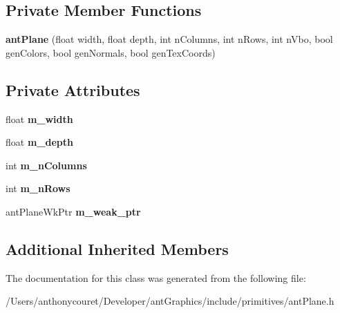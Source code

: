 \subsection*{Private Member Functions}
\begin{DoxyCompactItemize}
\item 
\hypertarget{classant_plane_a247818056d0868caa48ae8fe8be7cea8}{{\bfseries ant\+Plane} (float width, float depth, int n\+Columns, int n\+Rows, int n\+Vbo, bool gen\+Colors, bool gen\+Normals, bool gen\+Tex\+Coords)}\label{classant_plane_a247818056d0868caa48ae8fe8be7cea8}

\end{DoxyCompactItemize}
\subsection*{Private Attributes}
\begin{DoxyCompactItemize}
\item 
\hypertarget{classant_plane_a149d1bb80ff074bad37bad7fd4aa6159}{float {\bfseries m\+\_\+width}}\label{classant_plane_a149d1bb80ff074bad37bad7fd4aa6159}

\item 
\hypertarget{classant_plane_a089bbfa1fbdada0c4fde3c95f8cc2177}{float {\bfseries m\+\_\+depth}}\label{classant_plane_a089bbfa1fbdada0c4fde3c95f8cc2177}

\item 
\hypertarget{classant_plane_aa6d27a983a39724bf78d282d32736a1e}{int {\bfseries m\+\_\+n\+Columns}}\label{classant_plane_aa6d27a983a39724bf78d282d32736a1e}

\item 
\hypertarget{classant_plane_a0d3ec74b12f96ee9c19def16de3f0d12}{int {\bfseries m\+\_\+n\+Rows}}\label{classant_plane_a0d3ec74b12f96ee9c19def16de3f0d12}

\item 
\hypertarget{classant_plane_a5026e9579dde0955193ad12bfd90f554}{ant\+Plane\+Wk\+Ptr {\bfseries m\+\_\+weak\+\_\+ptr}}\label{classant_plane_a5026e9579dde0955193ad12bfd90f554}

\end{DoxyCompactItemize}
\subsection*{Additional Inherited Members}


The documentation for this class was generated from the following file\+:\begin{DoxyCompactItemize}
\item 
/\+Users/anthonycouret/\+Developer/ant\+Graphics/include/primitives/ant\+Plane.\+h\end{DoxyCompactItemize}
